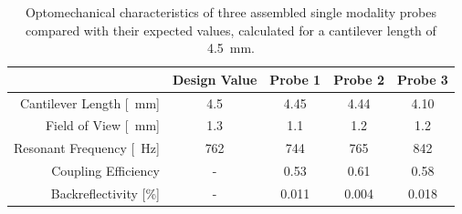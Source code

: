 \begin{table}[h!]\centering
\caption{Optomechanical characteristics of three assembled single modality probes compared with their expected values, calculated for a cantilever length of \SI{4.5}{\milli\meter}.}
\begin{tabular}{rcccc}
& 							\textbf{Design Value}&\textbf{Probe 1} & \textbf{Probe 2} & \textbf{Probe 3} \\ 
\hline
Cantilever Length [\SI{}{\milli\meter}] & 	4.5		& 	4.45 	& 	4.44	& 	4.10	\\
Field of View [\SI{}{\milli\meter}]		&	1.3		&	1.1	 	&	1.2 	& 	1.2  	\\ 
Resonant Frequency [\SI{}{\hertz}]  	&	762		& 	744		&	765 	& 	842 	\\ 
Coupling Efficiency  					&	-		& 	0.53	&	0.61 	&	0.58 	\\ 
Backreflectivity [\%] 					&	-		& 	0.011	&	0.004 	& 	0.018 	\\ 
\hline
\end{tabular} 
\label{tab:char}
\end{table}
